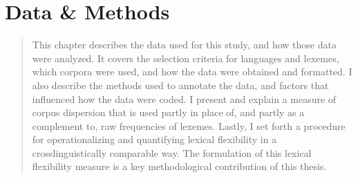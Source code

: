 \chapter{Data \& Methods}
\label{ch:methods}

\blockquote{This chapter describes the data used for this study, and how those data were analyzed. It covers the selection criteria for languages and lexemes, which corpora were used, and how the data were obtained and formatted. I also describe the methods used to annotate the data, and factors that influenced how the data were coded. I present and explain a measure of corpus dispersion that is used partly in place of, and partly as a complement to, raw frequencies of lexemes. Lastly, I set forth a procedure for operationalizing and quantifying lexical flexibility in a crosslinguistically comparable way. The formulation of this lexical flexibility measure is a key methodological contribution of this thesis.}
